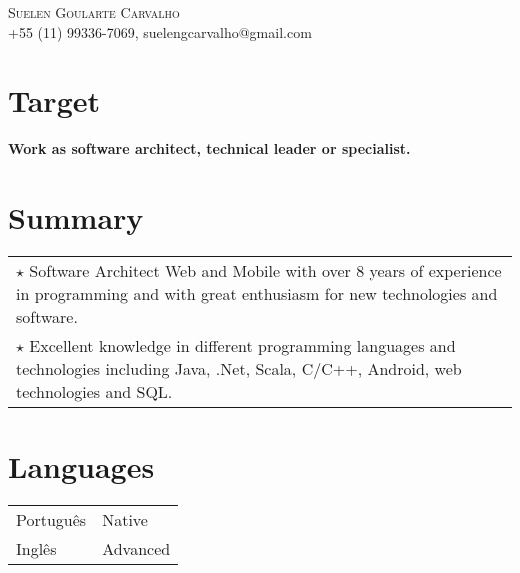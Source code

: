 \documentclass[a4paper, oneside, final]{scrartcl}
\newcommand{\vspc}{\vspace{0.15cm}} %
\begin{document}
\begin{center}
\textsc{\Huge{Suelen Goularte Carvalho}} \vspc\\
{\small +55 (11) 99336-7069, suelengcarvalho@gmail.com} 


\section{Target}
	{\bf Work as software architect, technical leader or specialist.}



\section{Summary}
\begin{tabularx}{1\linewidth}{X}
	$\star$ Software Architect Web and Mobile with over 8 years of experience in programming and with great enthusiasm for new technologies and software. \vspc\\
	
	$\star$ Excellent knowledge in different programming languages and technologies including Java, .Net, Scala, C/C++, Android, web technologies and SQL. \vspc\\
\end{tabularx}


\section{Languages}
\begin{tabularx}{1\linewidth}{p{2cm}X}
Português      	& Native\\
Inglês      	& Advanced\\
\end{tabularx}


\end{center}
\end{document}
